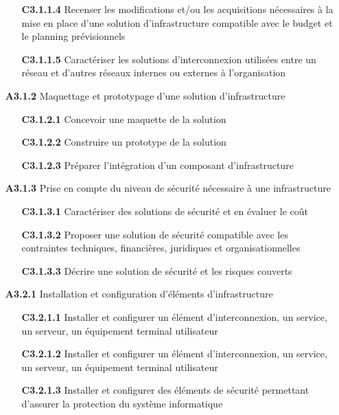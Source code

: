 \documentclass[12pt,a4paper,oneside,titlepage,final]{article}
\begin{document}
\begin{enumerate}
\begin{itemize}
    \item [\textbf{C3.1.1.4}] Recenser les modifications et/ou les
    acquisitions nécessaires à la mise en place d'une solution
    d'infrastructure compatible avec le budget et le planning
    prévisionnels
    \item [\textbf{C3.1.1.5}] Caractériser les solutions
    d'interconnexion utilisées entre un réseau et d'autres réseaux
    internes ou externes à l'organisation
  \end{itemize}
  \item [\textbf{A3.1.2}] Maquettage et prototypage d'une solution
  d'infrastructure
  \begin{itemize}
    \item [\textbf{C3.1.2.1}] Concevoir une maquette de la
    solution
    \item [\textbf{C3.1.2.2}] Construire un prototype de la solution
    \item [\textbf{C3.1.2.3}] Préparer l'intégration d'un composant
    d'infrastructure
  \end{itemize}
  \item [\textbf{A3.1.3}] Prise en compte du niveau de sécurité
  nécessaire à une infrastructure
  \begin{itemize}
    \item [\textbf{C3.1.3.1}] Caractériser des solutions de
    sécurité et en évaluer le coût
    \item [\textbf{C3.1.3.2}] Proposer une solution de sécurité
    compatible avec les contraintes techniques, financières,
    juridiques et organisationnelles
    \item [\textbf{C3.1.3.3}] Décrire une solution de sécurité et les
    risques couverts
  \end{itemize}
  \item [\textbf{A3.2.1}] Installation et configuration d'éléments
  d'infrastructure
  \begin{itemize}
    \item [\textbf{C3.2.1.1}] Installer et configurer un élément
    d'interconnexion, un service, un serveur, un équipement terminal
    utilisateur
    \item [\textbf{C3.2.1.2}] Installer et configurer un élément
    d'interconnexion, un service, un serveur, un équipement terminal
    utilisateur
    \item [\textbf{C3.2.1.3}] Installer et configurer des éléments de
    sécurité permettant d'assurer la protection du système
    informatique
  \end{itemize}

\end{enumerate}
\end{document}
